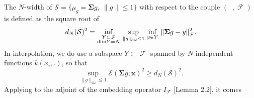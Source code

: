 \documentclass[twoside,11pt]{book}
\numberwithin{theorem}{chapter}
\numberwithin{definition}{chapter}
\numberwithin{proposition}{chapter}
\numberwithin{corollary}{chapter}
\numberwithin{example}{chapter}
\numberwithin{lemma}{chapter}
\DeclareMathOperator{\F}{\mathcal{F}}
\DeclareMathOperator{\Ltwo}{\mathbb{L}_{2}(\mathrm{d} \omega)}
\newcommand{\rb}[1]{\textcolor{magenta}{#1}}
\begin{document}
 The $N$-width of $\mathcal{S} = \{ \mu_{g} = \bm{\bm{\Sigma}}g, \: \|g\|_{\Ltwo} \leq 1\}$ with respect to the couple $(\Ltwo, \F)$ \citep[Chapter 1.7]{Pin12} is defined as the square root of
\begin{equation}
	d_{N}(\mathcal{S})^{2}  = \inf\limits_{\substack{Y \subset \F\\ \mathrm{dim}Y = N}}\, \sup\limits_{\|g\|_{\mathrm{d}\omega} \leq 1}\, \inf\limits_{y \in Y}\, \|\bm{\Sigma} g -y \|_{\F}^{2}.  \\
\end{equation}
In interpolation, we do use a subspace $Y \subset \F$ spanned by $N$ independent functions $k(x_{i},.)$, so that
\begin{equation}
\sup\limits_{\|g\|_{\mathrm{d}\omega} \leq 1} \mathcal{E}(\bm{\Sigma} g;\bm{x})^{2} \geq d_{N}(\mathcal{S})^{2}.
\end{equation}
Applying \citep[Theorem 2.2, Chapter 4]{Pin12} to the adjoint of the embedding operator $I_{\F}$ \cite{StSc12}[Lemma 2.2], it comes
%
\end{document}
